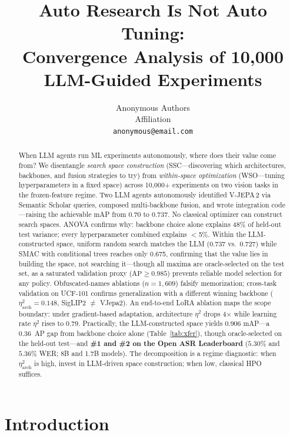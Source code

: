 \documentclass{article}
\title{Auto Research Is Not Auto Tuning:\\Convergence Analysis of 10{,}000 LLM-Guided Experiments}
\author{
Anonymous Authors \\
Affiliation \\
\texttt{anonymous@email.com}
}
\begin{document}
\maketitle

\begin{abstract}
When LLM agents run ML experiments autonomously, where does their value come from?
We disentangle \emph{search space construction} (SSC---discovering which architectures, backbones, and fusion strategies to try) from \emph{within-space optimization} (WSO---tuning hyperparameters in a fixed space) across 10{,}000+ experiments on two vision tasks in the frozen-feature regime.
Two LLM agents autonomously identified V-JEPA\,2 via Semantic Scholar queries, composed multi-backbone fusion, and wrote integration code---raising the achievable mAP from $0.70$ to $0.737$. No classical optimizer can construct search spaces.
ANOVA confirms why: backbone choice alone explains 48\% of held-out test variance; every hyperparameter combined explains $<$5\%.
Within the LLM-constructed space, uniform random search matches the LLM (0.737 vs.\ 0.727) while SMAC with conditional trees reaches only 0.675, confirming that the value lies in building the space, not searching it---though all maxima are oracle-selected on the test set, as a saturated validation proxy ($\text{AP}\!\ge\!0.985$) prevents reliable model selection for any policy.
Obfuscated-names ablations ($n = 1{,}609$) falsify memorization; cross-task validation on UCF-101 confirms generalization with a different winning backbone ($\eta^2_{\mathrm{arch}} = 0.148$, SigLIP2 $\neq$ VJepa2).
An end-to-end LoRA ablation maps the scope boundary: under gradient-based adaptation, architecture $\eta^2$ drops 4$\times$ while learning rate $\eta^2$ rises to 0.79.
Practically, the LLM-constructed space yields $0.906$ mAP---a 0.36~AP gap from backbone choice alone (Table~\ref{tab:xfer}), though oracle-selected on the held-out test---and \textbf{\#1 and \#2 on the Open ASR Leaderboard} ($5.30\%$ and $5.36\%$ WER; 8B and 1.7B models).
The decomposition is a regime diagnostic: when $\eta^2_{\mathrm{arch}}$ is high, invest in LLM-driven space construction; when low, classical HPO suffices.
\end{abstract}

\section{Introduction}
\label{sec:intro}
\end{document}
